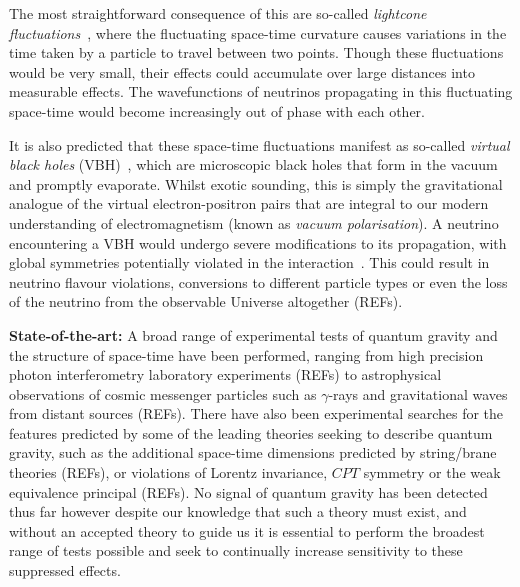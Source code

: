 \documentclass[a4paper,11pt]{article}
\begin{document}
The most straightforward consequence of this are so-called \textit{lightcone fluctuations}~\cite{PauliLightcone, Ford1999, gr-qc/9909085}, where the fluctuating space-time curvature causes variations in the time taken by a particle to travel between two points. Though these fluctuations would be very small, their effects could accumulate over large distances into measurable effects. The wavefunctions of neutrinos propagating in this fluctuating space-time would become increasingly out of phase with each other.

It is also predicted that these space-time fluctuations manifest as so-called \textit{virtual black holes} (VBH)~\cite{Hawking1982,PhysRevD.53.3099}, which are microscopic black holes that form in the vacuum and promptly evaporate. Whilst exotic sounding, this is simply the gravitational analogue of the virtual electron-positron pairs that are integral to our modern understanding of electromagnetism (known as \textit{vacuum polarisation}). A neutrino encountering a VBH would undergo severe modifications to its propagation, with global symmetries potentially violated in the interaction~\cite{Anchordoqui:2005gj, PhysRevD.102.115003, Hellmann:2021jyz}. This could result in neutrino flavour violations, conversions to different particle types or even the loss of the neutrino from the observable Universe altogether (REFs).

\textbf{State-of-the-art:} A broad range of experimental tests of quantum gravity and the structure of space-time have been performed, ranging from high precision photon interferometry laboratory experiments (REFs) to astrophysical observations of cosmic messenger particles such as $\gamma$-rays and gravitational waves from distant sources (REFs). There have also been experimental searches for the features predicted by some of the leading theories seeking to describe quantum gravity, such as the additional space-time dimensions predicted by string/brane theories (REFs), or violations of Lorentz invariance, $CPT$ symmetry or the weak equivalence principal (REFs). No signal of quantum gravity has been detected thus far however despite our knowledge that such a theory must exist, and without an accepted theory to guide us it is essential to perform the broadest range of tests possible and seek to continually increase sensitivity to these suppressed effects. \\



\end{document}
